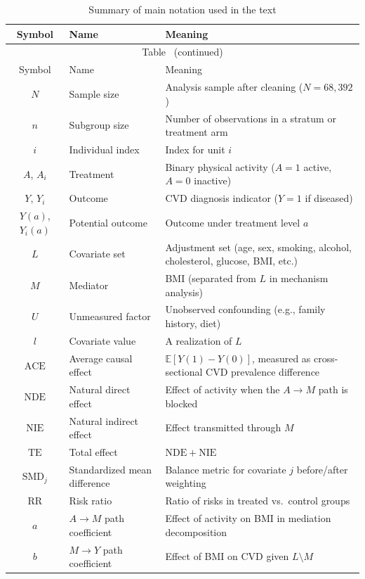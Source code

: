 \documentclass[12pt,a4paper]{article}
\newcommand{\E}{\mathbb{E}}
\begin{document}
\small
\begin{longtable}{@{}clp{8.2cm}@{}}
\caption{Summary of main notation used in the text}\label{tab:notation} \\
\toprule
Symbol & Name & Meaning \\
\midrule
\endfirsthead
\multicolumn{3}{c}{\small Table~\thetable{} (continued)} \\
\toprule
Symbol & Name & Meaning \\
\midrule
\endhead
\bottomrule
\endfoot
\bottomrule
\endlastfoot
$N$ & Sample size & Analysis sample after cleaning ($N=68{,}392$) \\
$n$ & Subgroup size & Number of observations in a stratum or treatment arm \\
$i$ & Individual index & Index for unit $i$ \\
$A$, $A_i$ & Treatment & Binary physical activity ($A=1$ active, $A=0$ inactive) \\
$Y$, $Y_i$ & Outcome & CVD diagnosis indicator ($Y=1$ if diseased) \\
$Y(a)$, $Y_i(a)$ & Potential outcome & Outcome under treatment level $a$ \\
$L$ & Covariate set & Adjustment set (age, sex, smoking, alcohol, cholesterol, glucose, BMI, etc.) \\
$M$ & Mediator & BMI (separated from $L$ in mechanism analysis) \\
$U$ & Unmeasured factor & Unobserved confounding (e.g., family history, diet) \\
$l$ & Covariate value & A realization of $L$ \\
$\mathrm{ACE}$ & Average causal effect & $\E[Y(1)-Y(0)]$, measured as cross-sectional CVD prevalence difference \\
$\mathrm{NDE}$ & Natural direct effect & Effect of activity when the $A\to M$ path is blocked \\
$\mathrm{NIE}$ & Natural indirect effect & Effect transmitted through $M$ \\
$\mathrm{TE}$ & Total effect & $\mathrm{NDE}+\mathrm{NIE}$ \\
$\mathrm{SMD}_j$ & Standardized mean difference & Balance metric for covariate $j$ before/after weighting \\
$\mathrm{RR}$ & Risk ratio & Ratio of risks in treated vs.\ control groups \\
$a$ & $A\to M$ path coefficient & Effect of activity on BMI in mediation decomposition \\
$b$ & $M\to Y$ path coefficient & Effect of BMI on CVD given $L\setminus M$ \\

\end{longtable}
\end{document}
